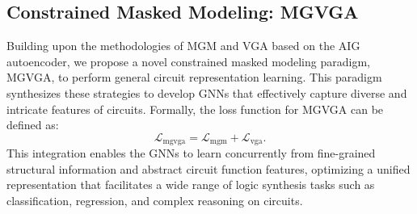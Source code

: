 \subsection{Constrained Masked Modeling: MGVGA}

Building upon the methodologies of MGM and VGA based on the AIG autoencoder, we propose a novel constrained masked modeling paradigm, MGVGA, to perform general circuit representation learning. 
This paradigm synthesizes these strategies to develop GNNs that effectively capture diverse and intricate features of circuits.
Formally, the loss function for MGVGA can be defined as:
\begin{equation}
    \mathcal{L}_{\text{mgvga}} = \mathcal{L}_{\text{mgm}} + \mathcal{L}_{\text{vga}}.
\end{equation}
This integration enables the GNNs to learn concurrently from fine-grained structural information and abstract circuit function features, optimizing a unified representation that facilitates a wide range of logic synthesis tasks such as classification, regression, and complex reasoning on circuits.
